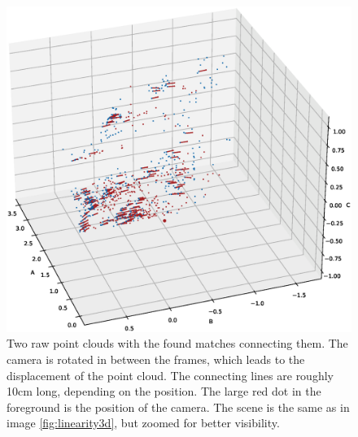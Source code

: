 \begin{figure}[H]
  \centering
  \includegraphics[width=1.0\textwidth,trim={7cm 7cm 8cm 5cm},clip]{images/3d_features_rotation.eps}
  \caption{Two raw point clouds with the found matches connecting them. The camera is rotated in between the frames, which leads to the displacement of the point cloud. The connecting lines are roughly 10cm long, depending on the position. The large red dot in the foreground is the position of the camera. The scene is the same as in image \ref{fig:linearity3d}, but zoomed for better visibility.}
  \label{im:3d_features_rotation}
\end{figure}
